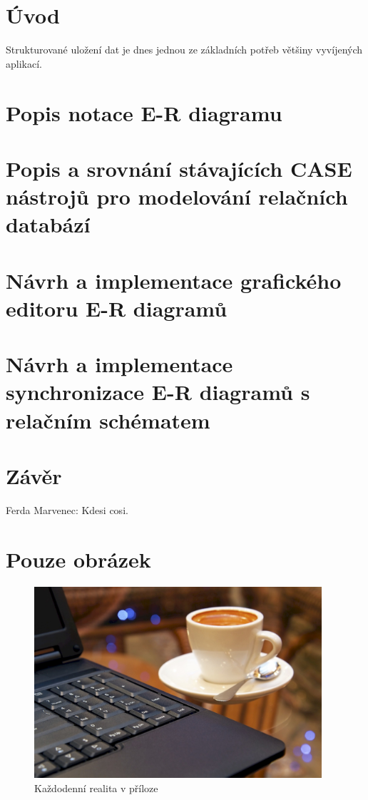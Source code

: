 \documentclass[czech,bachelor,public,dept460,male,twoside]{diploma}
\begin{document}
\MakeTitlePages

\lstlistoflistings

\section{Úvod}
Strukturované uložení dat je dnes jednou ze základních potřeb většiny vyvíjených aplikací. 


\section{Popis notace E-R diagramu}

\section{Popis a srovnání stávajících CASE nástrojů pro modelování relačních databází}

\section{Návrh a implementace grafického editoru E-R diagramů}

\section{Návrh a implementace synchronizace E-R diagramů s relačním schématem}

\section{Závěr}

\begin{thebibliography}{99}
	 Ferda Marvenec: Kdesi cosi.
\end{thebibliography}


\appendix
\section{Pouze obrázek}
\begin{figure}[!h]\centering\includegraphics[width=0.95\textwidth]{Figures/CoffeeAndComputer.jpg}\caption{Každodenní realita v příloze}\end{figure}
\end{document}
